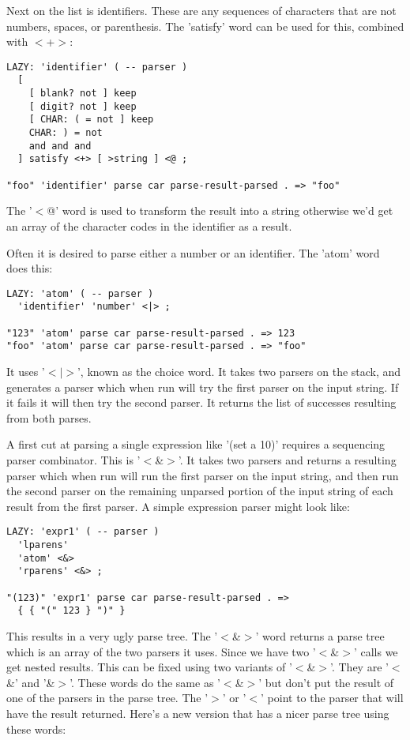 Next on the list is identifiers. These are any sequences of characters
that are not numbers, spaces, or parenthesis. The 'satisfy' word can
be used for this, combined with $<$+$>$:

\begin{verbatim}
LAZY: 'identifier' ( -- parser )
  [ 
    [ blank? not ] keep 
    [ digit? not ] keep 
    [ CHAR: ( = not ] keep 
    CHAR: ) = not 
    and and and    
  ] satisfy <+> [ >string ] <@ ;

"foo" 'identifier' parse car parse-result-parsed . => "foo"
\end{verbatim}

The '$<$@' word is used to transform the result into a string otherwise
we'd get an array of the character codes in the identifier as a
result.

Often it is desired to parse either a number or an identifier. The
'atom' word does this:

\begin{verbatim}
LAZY: 'atom' ( -- parser )
  'identifier' 'number' <|> ;

"123" 'atom' parse car parse-result-parsed . => 123
"foo" 'atom' parse car parse-result-parsed . => "foo"
\end{verbatim}

It uses '$<|>$', known as the choice word. It takes two parsers on the
stack, and generates a parser which when run will try the first parser
on the input string. If it fails it will then try the second
parser. It returns the list of successes resulting from both parses.

A first cut at parsing a single expression like '(set a 10)' requires
a sequencing parser combinator. This is '$<$\&$>$'. It takes two parsers
and returns a resulting parser which when run will run the first
parser on the input string, and then run the second parser on the
remaining unparsed portion of the input string of each result from the
first parser. A simple expression parser might look like:

\begin{verbatim}
LAZY: 'expr1' ( -- parser )
  'lparens' 
  'atom' <&>
  'rparens' <&> ;

"(123)" 'expr1' parse car parse-result-parsed . =>
  { { "(" 123 } ")" }
\end{verbatim}

This results in a very ugly parse tree. The '$<$\&$>$' word returns a parse
tree which is an array of the two parsers it uses. Since we have two
'$<$\&$>$' calls we get nested results. This can be fixed using two
variants of '$<$\&$>$'. They are '$<$\&' and '\&$>$'. These words do the same as
'$<$\&$>$' but don't put the result of one of the parsers in the parse
tree. The '$>$' or '$<$' point to the parser that will have the result
returned. Here's a new version that has a nicer parse tree using these
words:

